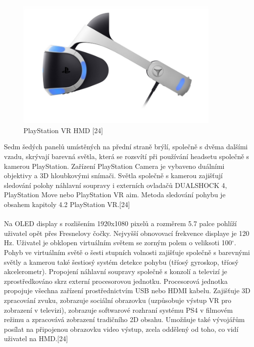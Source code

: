 \documentclass[a4paper, 12pt]{report}
\begin{document}
\begin{figure}[h!]
	\centering
	\includegraphics[width=10cm]{PS.jpg}
	\caption{PlayStation VR HMD [24]}
\end{figure}

Sedm šedých panelů umístěných na přední straně brýlí, společně s dvěma dalšími vzadu, skrývají barevná světla, která se rozsvítí při používání headsetu společně s kamerou PlayStation. Zařízení PlayStation Camera je vybaveno duálními objektivy a 3D hloubkovými snímači. Světla společně s kamerou zajišťují sledování polohy náhlavní soupravy i externích ovladačů DUALSHOCK 4, PlayStation Move nebo PlayStation VR aim. Metoda sledování pohybu je obsahem kapitoly 4.2 PlayStation VR.[24]\\
\\
Na OLED display s rozlišením 1920x1080 pixelů a rozměrem 5.7 palce pohlíží uživatel opět přes Fresnelovy čočky. Nejvyšší obnovovací frekvence displaye je 120 Hz. Uživatel je obklopen virtuálním světem se zorným polem o veliksoti 100$^\circ$. Pohyb ve virtuálním světě o šesti stupních volnosti zajišťuje společně s barevnými světly a kamerou také šestiosý systém detekce pohybu (tříosý gyroskop, tříosý akcelerometr). Propojení náhlavní soupravy společně s konzolí a televizí je zprostředkováno skrz externí procesorovou jednotku. Procesorová jednotka propojuje všechna zařízení prostřednictvím USB nebo HDMI kabelu. Zajišťuje 3D zpracování zvuku, zobrazuje sociální obrazovku (uzpůsobuje výstup VR pro zobrazení v televizi), zobrazuje softwarové rozhraní systému PS4 v filmovém režimu a zpracovává zobrazení tradičního 2D obsahu. Umožňuje také vývojářům posílat na připojenou obrazovku video výstup, zcela oddělený od toho, co vidí uživatel na HMD.[24]
\end{document}
